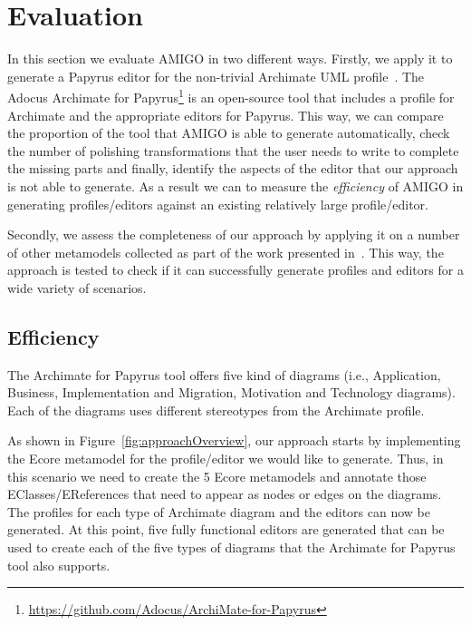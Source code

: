 \section{Evaluation}
\label{sec:evaluation}

In this section we evaluate AMIGO in two different ways. 
Firstly, we apply it to generate a Papyrus editor for the non-trivial Archimate 
UML profile~\cite{iacob2009archimate,haren2012archimate}. The Adocus Archimate 
for Papyrus\footnote{\url{https://github.com/Adocus/ArchiMate-for-Papyrus}} is 
an open-source tool that includes a profile for Archimate and the appropriate 
editors for Papyrus. This way, we can compare the proportion of the tool that 
AMIGO is able to generate automatically, check the number of polishing 
transformations that the user needs to write to complete the missing parts and 
finally, identify the aspects of the editor that our approach is not able to 
generate. As a result we can to measure the \textit{efficiency} of AMIGO in generating profiles/editors against an existing relatively large 
profile/editor. 

Secondly, we assess the completeness of our approach by applying it on a number 
of other metamodels collected as part of the work presented 
in~\cite{williams2013metamodels}. This way, the approach is tested to check if 
it can successfully generate profiles and editors for a wide variety of 
scenarios.

\subsection{Efficiency}
\label{sec:efficiencyEvaluation}
The Archimate for Papyrus tool offers five kind of diagrams (i.e., Application, Business, Implementation and Migration, Motivation and Technology diagrams). Each of the diagrams uses different stereotypes from the Archimate profile. 

As shown in Figure~\ref{fig:approachOverview}, our approach starts by 
implementing the Ecore metamodel for the profile/editor we would like to 
generate. Thus, in this scenario we need to create the 5 Ecore metamodels and 
annotate those EClasses/EReferences that need to appear as nodes or edges on 
the diagrams. The profiles for each type of Archimate diagram and the editors 
can now be generated. At this point, five fully functional editors are 
generated that can be used to create each of the five types of diagrams that 
the Archimate for Papyrus tool also supports. 

